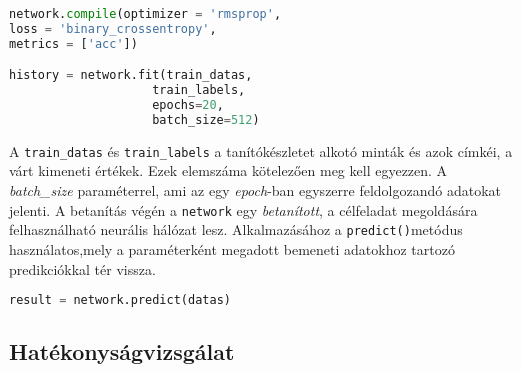 \begin{minipage}{\linewidth}
\begin{lstlisting}[language=Python,caption=Hálózat betanítása]
network.compile(optimizer = 'rmsprop',
loss = 'binary_crossentropy',
metrics = ['acc'])

history = network.fit(train_datas,
					train_labels,
					epochs=20,
					batch_size=512)
\end{lstlisting}\label{lst:fitNetwork}
\end{minipage}

A \verb|train_datas| és \verb|train_labels| a tanítókészletet alkotó minták és azok címkéi, a várt kimeneti értékek. Ezek elemszáma kötelezően meg kell egyezzen. A \emph{batch\_size} paraméterrel, ami az egy \emph{epoch}-ban egyszerre feldolgozandó adatokat jelenti. A betanítás végén a \verb|network| egy \emph{betanított}, a célfeladat megoldására felhasználható neurális hálózat lesz. Alkalmazásához a \verb|predict()|metódus használatos,mely a paraméterként megadott bemeneti adatokhoz tartozó predikciókkal tér vissza.
\begin{minipage}{\linewidth}
\begin{lstlisting}[language=Python, caption=Következtetés]
	result = network.predict(datas)
\end{lstlisting}
\end{minipage}

\subsection{Hatékonyságvizsgálat}


